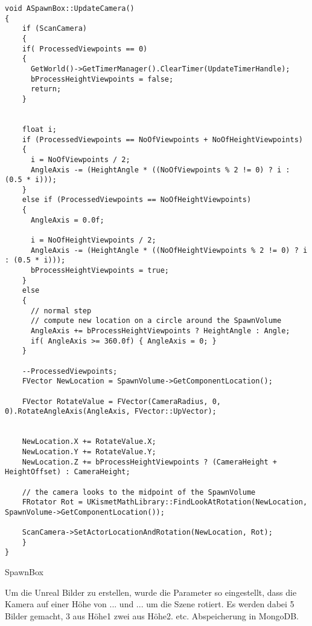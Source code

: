 \begin{algorithm}[H]
\begin{lstlisting}
void ASpawnBox::UpdateCamera()
{
	if (ScanCamera)
	{
    if( ProcessedViewpoints == 0)
    {
      GetWorld()->GetTimerManager().ClearTimer(UpdateTimerHandle);
      bProcessHeightViewpoints = false;
      return;
    }


    float i;
    if (ProcessedViewpoints == NoOfViewpoints + NoOfHeightViewpoints)
    {
      i = NoOfViewpoints / 2;
      AngleAxis -= (HeightAngle * ((NoOfViewpoints % 2 != 0) ? i : (0.5 * i)));
    }
    else if (ProcessedViewpoints == NoOfHeightViewpoints)
    {
      AngleAxis = 0.0f;

      i = NoOfHeightViewpoints / 2;
      AngleAxis -= (HeightAngle * ((NoOfHeightViewpoints % 2 != 0) ? i : (0.5 * i)));
      bProcessHeightViewpoints = true;
    }
    else
    {
      // normal step
      // compute new location on a circle around the SpawnVolume
      AngleAxis += bProcessHeightViewpoints ? HeightAngle : Angle;
      if( AngleAxis >= 360.0f) { AngleAxis = 0; }
    }

    --ProcessedViewpoints;
    FVector NewLocation = SpawnVolume->GetComponentLocation();

    FVector RotateValue = FVector(CameraRadius, 0, 0).RotateAngleAxis(AngleAxis, FVector::UpVector);


    NewLocation.X += RotateValue.X;
    NewLocation.Y += RotateValue.Y;
    NewLocation.Z += bProcessHeightViewpoints ? (CameraHeight + HeightOffset) : CameraHeight;

    // the camera looks to the midpoint of the SpawnVolume
    FRotator Rot = UKismetMathLibrary::FindLookAtRotation(NewLocation, SpawnVolume->GetComponentLocation());

    ScanCamera->SetActorLocationAndRotation(NewLocation, Rot);
	}
}
\end{lstlisting}
 \caption{SpawnBox}
\end{algorithm}

 \par

Um die Unreal Bilder zu erstellen, wurde die Parameter so eingestellt, dass die Kamera auf einer Höhe von ... und ... um die Szene rotiert. Es werden dabei 5 Bilder gemacht, 3 aus Höhe1 zwei aus Höhe2. etc.    Abspeicherung in MongoDB.

